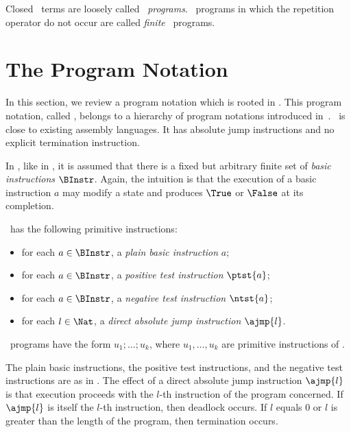 \documentclass[fleqn]{llncs}
\begin{document}
Closed \PGA\ terms are loosely called \PGA\ \emph{programs}.
\PGA\ programs in which the repetition operator do not occur
are called \emph{finite} \PGA\ programs.


\section{The Program Notation \PGLD}
\label{sect-PGLD}

In this section, we review a program notation which is rooted in \PGA.
This program notation, called \PGLD, belongs to a hierarchy of program
notations introduced in~\cite{BL02a}.
\PGLD\ is close to existing assembly languages.
It has absolute jump instructions and no explicit termination
instruction.

In \PGLD, like in \PGA, it is assumed that there is a fixed but
arbitrary finite set of \emph{basic instructions} $\BInstr$.
Again, the intuition is that the execution of a basic instruction $a$
may modify a state and produces $\True$ or $\False$ at its completion.

\PGLD\ has the following primitive instructions:
\begin{itemize}
\item
for each $a \in \BInstr$, a \emph{plain basic instruction} $a$;
\item
for each $a \in \BInstr$, a \emph{positive test instruction} $\ptst{a}$;
\item
for each $a \in \BInstr$, a \emph{negative test instruction} $\ntst{a}$;
\item
for each $l \in \Nat$, a \emph{direct absolute jump instruction}
$\ajmp{l}$.
\end{itemize}
\PGLD\ programs have the form $u_1;\ldots;u_k$, where $u_1,\ldots,u_k$
are primitive instructions of \PGLD.

The plain basic instructions, the positive test instructions, and the
negative test instructions are as in \PGA.
The effect of a direct absolute jump instruction $\ajmp{l}$ is that
execution proceeds with the $l$-th instruction of the program concerned.
If $\ajmp{l}$ is itself the $l$-th instruction, then deadlock occurs.
If $l$ equals $0$ or $l$ is greater than the length of the program, then
termination occurs.
\end{document}
